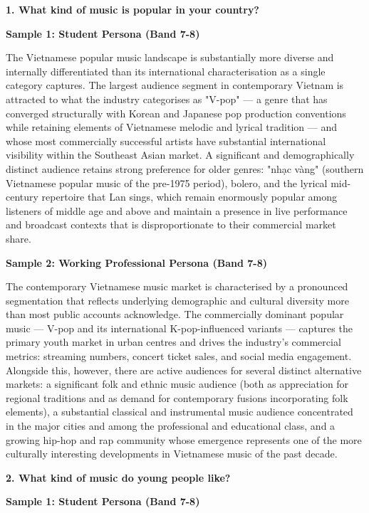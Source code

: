 \partthreeheader

\begin{ieltsquestion}
\textbf{1. What kind of music is popular in your country?}
\end{ieltsquestion}
\textbf{Sample 1: Student Persona (Band 7-8)}

The Vietnamese popular music landscape is substantially more diverse and internally differentiated than its international characterisation as a single category captures. The largest audience segment in contemporary Vietnam is attracted to what the industry categorises as "V-pop" — a genre that has converged structurally with Korean and Japanese pop production conventions while retaining elements of Vietnamese melodic and lyrical tradition — and whose most commercially successful artists have substantial international visibility within the Southeast Asian market. A significant and demographically distinct audience retains strong preference for older genres: "nhạc vàng" (southern Vietnamese popular music of the pre-1975 period), bolero, and the lyrical mid-century repertoire that Lan sings, which remain enormously popular among listeners of middle age and above and maintain a presence in live performance and broadcast contexts that is disproportionate to their commercial market share.

\textbf{Sample 2: Working Professional Persona (Band 7-8)}

The contemporary Vietnamese music market is characterised by a pronounced segmentation that reflects underlying demographic and cultural diversity more than most public accounts acknowledge. The commercially dominant popular music — V-pop and its international K-pop-influenced variants — captures the primary youth market in urban centres and drives the industry's commercial metrics: streaming numbers, concert ticket sales, and social media engagement. Alongside this, however, there are active audiences for several distinct alternative markets: a significant folk and ethnic music audience (both as appreciation for regional traditions and as demand for contemporary fusions incorporating folk elements), a substantial classical and instrumental music audience concentrated in the major cities and among the professional and educational class, and a growing hip-hop and rap community whose emergence represents one of the more culturally interesting developments in Vietnamese music of the past decade.

\separator

\begin{ieltsquestion}
\textbf{2. What kind of music do young people like?}
\end{ieltsquestion}
\textbf{Sample 1: Student Persona (Band 7-8)}

